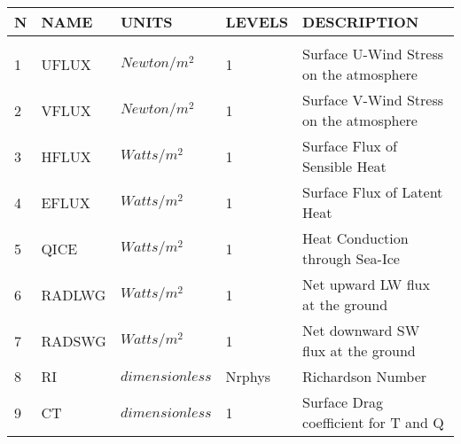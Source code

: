 \begin{tabular}{lllll}
\hline\hline
N & NAME & UNITS & LEVELS & DESCRIPTION \\
\hline

&\\
1 & UFLUX    &   $Newton/m^2$  &    1  
         &\begin{minipage}[t]{3in}
          {Surface U-Wind Stress on the atmosphere}
         \end{minipage}\\
2 & VFLUX    &   $Newton/m^2$  &    1  
         &\begin{minipage}[t]{3in}
          {Surface V-Wind Stress on the atmosphere}
         \end{minipage}\\
3 & HFLUX    &   $Watts/m^2$  &    1  
         &\begin{minipage}[t]{3in}
          {Surface Flux of Sensible Heat}
         \end{minipage}\\
4 & EFLUX    &   $Watts/m^2$  &    1  
         &\begin{minipage}[t]{3in}
          {Surface Flux of Latent Heat}
         \end{minipage}\\
5 & QICE     &   $Watts/m^2$  &    1  
         &\begin{minipage}[t]{3in}
          {Heat Conduction through Sea-Ice}
         \end{minipage}\\
6 & RADLWG   &   $Watts/m^2$ &    1  
         &\begin{minipage}[t]{3in}
          {Net upward LW flux at the ground}
         \end{minipage}\\
7 & RADSWG   &   $Watts/m^2$  &    1 
         &\begin{minipage}[t]{3in}
          {Net downward SW flux at the ground} 
         \end{minipage}\\
8 & RI       &  $dimensionless$ &  Nrphys 
         &\begin{minipage}[t]{3in}
          {Richardson Number}
         \end{minipage}\\
9 & CT       &  $dimensionless$ &  1 
         &\begin{minipage}[t]{3in}
          {Surface Drag coefficient for T and Q}
         \end{minipage}\\

\end{tabular}

